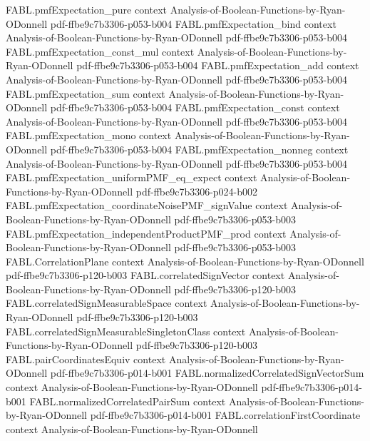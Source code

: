 \begin{theorem}
\proofstep
  {FABL.pmfExpectation_pure}
  {context}
  {Analysis-of-Boolean-Functions-by-Ryan-ODonnell}
  {pdf-ffbe9c7b3306-p053-b004}
\proofstep
  {FABL.pmfExpectation_bind}
  {context}
  {Analysis-of-Boolean-Functions-by-Ryan-ODonnell}
  {pdf-ffbe9c7b3306-p053-b004}
\proofstep
  {FABL.pmfExpectation_const_mul}
  {context}
  {Analysis-of-Boolean-Functions-by-Ryan-ODonnell}
  {pdf-ffbe9c7b3306-p053-b004}
\proofstep
  {FABL.pmfExpectation_add}
  {context}
  {Analysis-of-Boolean-Functions-by-Ryan-ODonnell}
  {pdf-ffbe9c7b3306-p053-b004}
\proofstep
  {FABL.pmfExpectation_sum}
  {context}
  {Analysis-of-Boolean-Functions-by-Ryan-ODonnell}
  {pdf-ffbe9c7b3306-p053-b004}
\proofstep
  {FABL.pmfExpectation_const}
  {context}
  {Analysis-of-Boolean-Functions-by-Ryan-ODonnell}
  {pdf-ffbe9c7b3306-p053-b004}
\proofstep
  {FABL.pmfExpectation_mono}
  {context}
  {Analysis-of-Boolean-Functions-by-Ryan-ODonnell}
  {pdf-ffbe9c7b3306-p053-b004}
\proofstep
  {FABL.pmfExpectation_nonneg}
  {context}
  {Analysis-of-Boolean-Functions-by-Ryan-ODonnell}
  {pdf-ffbe9c7b3306-p053-b004}
\proofstep
  {FABL.pmfExpectation_uniformPMF_eq_expect}
  {context}
  {Analysis-of-Boolean-Functions-by-Ryan-ODonnell}
  {pdf-ffbe9c7b3306-p024-b002}
\proofstep
  {FABL.pmfExpectation_coordinateNoisePMF_signValue}
  {context}
  {Analysis-of-Boolean-Functions-by-Ryan-ODonnell}
  {pdf-ffbe9c7b3306-p053-b003}
\proofstep
  {FABL.pmfExpectation_independentProductPMF_prod}
  {context}
  {Analysis-of-Boolean-Functions-by-Ryan-ODonnell}
  {pdf-ffbe9c7b3306-p053-b003}
\proofstep
  {FABL.CorrelationPlane}
  {context}
  {Analysis-of-Boolean-Functions-by-Ryan-ODonnell}
  {pdf-ffbe9c7b3306-p120-b003}
\proofstep
  {FABL.correlatedSignVector}
  {context}
  {Analysis-of-Boolean-Functions-by-Ryan-ODonnell}
  {pdf-ffbe9c7b3306-p120-b003}
\proofstep
  {FABL.correlatedSignMeasurableSpace}
  {context}
  {Analysis-of-Boolean-Functions-by-Ryan-ODonnell}
  {pdf-ffbe9c7b3306-p120-b003}
\proofstep
  {FABL.correlatedSignMeasurableSingletonClass}
  {context}
  {Analysis-of-Boolean-Functions-by-Ryan-ODonnell}
  {pdf-ffbe9c7b3306-p120-b003}
\proofstep
  {FABL.pairCoordinatesEquiv}
  {context}
  {Analysis-of-Boolean-Functions-by-Ryan-ODonnell}
  {pdf-ffbe9c7b3306-p014-b001}
\proofstep
  {FABL.normalizedCorrelatedSignVectorSum}
  {context}
  {Analysis-of-Boolean-Functions-by-Ryan-ODonnell}
  {pdf-ffbe9c7b3306-p014-b001}
\proofstep
  {FABL.normalizedCorrelatedPairSum}
  {context}
  {Analysis-of-Boolean-Functions-by-Ryan-ODonnell}
  {pdf-ffbe9c7b3306-p014-b001}
\proofstep
  {FABL.correlationFirstCoordinate}
  {context}
  {Analysis-of-Boolean-Functions-by-Ryan-ODonnell}

\end{theorem}
